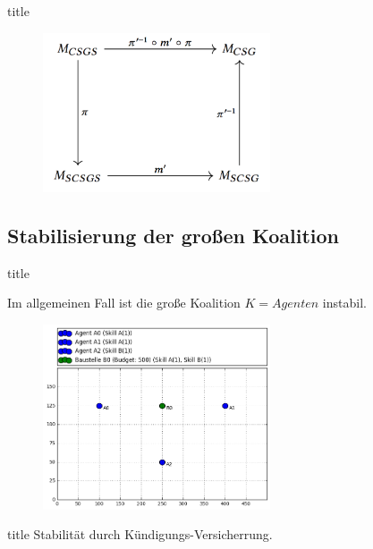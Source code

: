 \documentclass[c]{beamer}
\theoremstyle{break}
\begin{document}
  \begin{frame}{title}
    \begin{figure}
      \centering
      \includegraphics[width=0.6\textwidth]{bez.png}
    \end{figure}
  \end{frame}



  \subsection*{Stabilisierung der großen Koalition}
  \begin{frame}{title} %
    \begin{lemma}[Instabilität]
      Im allgemeinen Fall ist die große Koalition $K=Agenten$ instabil.
    \end{lemma}

      \begin{figure}
        \centering
        \includegraphics[width=0.6\textwidth]{example-exchangeable-agents.png}
        \label{szenario1}
      \end{figure}

  \end{frame}
  \begin{frame}{title} %
    Stabilität durch Kündigungs-Versicherrung.
  \end{frame}
\end{document}
